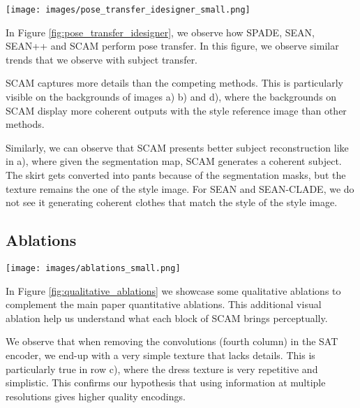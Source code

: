 \documentclass[runningheads]{llncs}
\makeatletter
\newcommand{\mname}{SCAM\@\xspace}
\makeatother
\begin{document}
\begin{figure*}[t!]
    \centering
    \texttt{[image: images/pose\_transfer\_idesigner\_small.png]}
     \caption{
     \small{\textbf{Pose Transfer in idesigner}. 
     We compare SCAM to competing methods on the pose transfer task.
     }}
    \label{fig:pose_transfer_idesigner}
\end{figure*}

In Figure \ref{fig:pose_transfer_idesigner}, we observe how SPADE, SEAN, SEAN++ and SCAM perform pose transfer. In this figure, we observe similar trends  that we observe with subject transfer.


\mname captures more details than the competing methods. This is particularly visible on the backgrounds of images a) b) and d), where the backgrounds on SCAM display more coherent outputs with the style reference image than other methods.

Similarly, we can observe that \mname presents better subject reconstruction like in a), where given the segmentation map, \mname generates a coherent subject. The skirt gets converted into pants because of the segmentation masks, but the texture remains the one of the style image. For SEAN and SEAN-CLADE, we do not see it generating coherent clothes that match the style of the style image.


\subsection{Ablations}
\begin{figure*}[t!]
    \centering
    \texttt{[image: images/ablations\_small.png]}
     \caption{
     \small{\textbf{Qualitative ablations on idesigner}. 
     We perform the same ablations as in the quantitative ablations section of the main paper.
     }}
    \label{fig:qualitative_ablations}
\end{figure*}

In Figure \ref{fig:qualitative_ablations} we showcase some qualitative ablations to complement the main paper quantitative ablations. This additional visual ablation help us understand what each block of \mname brings perceptually.

We observe that when removing the convolutions (fourth column) in the SAT encoder, we end-up with a very simple texture that lacks details. This is particularly true in row c), where the dress texture is very repetitive and simplistic. This confirms our hypothesis that using information at multiple resolutions gives higher quality encodings.
\end{document}
